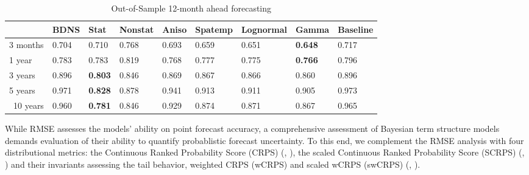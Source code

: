 \documentclass[
  12pt]{article}
\newcommand{\citeay}[1]{\citeauthor{#1}, \citeyear{#1}}
\begin{document}
\begin{table}[htbp]
    \begin{subtable}[t!]{\textwidth}
        \centering
        \caption{Out-of-Sample 12-month ahead forecasting}
        \begin{tabular}{l | l l l l l l l l}
        & BDNS & Stat  & Nonstat & Aniso & Spatemp & Lognormal & Gamma & Baseline  \\ \hline
        3 months & 0.704 & 0.710 & 0.768 & 0.693 & 0.659 & 0.651 & \textbf{0.648} & 0.717  \\ 
        1 year & 0.783 & 0.783 & 0.819 & 0.768 & 0.777 & 0.775 & \textbf{0.766} & 0.796  \\ 
        3 years & 0.896 & \textbf{0.803} & 0.846 & 0.869 & 0.867 & 0.866 & 0.860 & 0.896  \\ 
        5 years & 0.971 & \textbf{0.828} & 0.878 & 0.941 & 0.913 & 0.911 & 0.905 & 0.973  \\ \
        10 years & 0.960 & \textbf{0.781} & 0.846 & 0.929 & 0.874 & 0.871 & 0.867 & 0.965 \\ 
        \end{tabular}
        \label{tab:rmse3}
    \end{subtable}
    \label{rmse}
\end{table}

While RMSE assesses the models' ability on point forecast accuracy, a comprehensive assessment of Bayesian term structure models demands evaluation of their ability to quantify probablistic forecast uncertainty. To this end, we complement the RMSE analysis with four distributional metrics: the Continuous Ranked Probability Score (CRPS) (\citeay{gneiting2007strictly}), the scaled Continuous Ranked Probability Score (SCRPS) (\citeay{bolin2023local}) and their invariants assessing the tail behavior, weighted CRPS (wCRPS) and scaled wCRPS (swCRPS) (\citeay{olafsdottir2024locally}).
\end{document}
